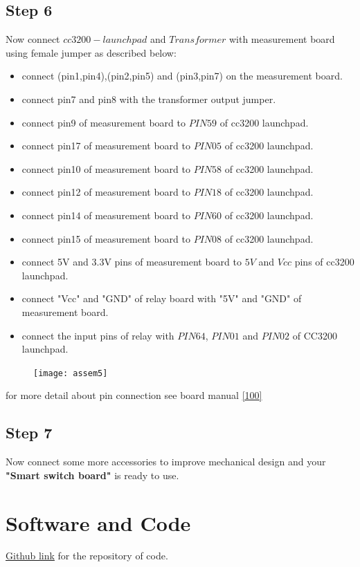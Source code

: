 \documentclass[a4paper,12pt,oneside]{book}
\begin{document}
\subsection*{Step 6}
Now connect $cc3200-launchpad$ and $Transformer$ with measurement board using female jumper as described below:
\begin{itemize}
	\item connect (pin1,pin4),(pin2,pin5) and (pin3,pin7) on the measurement board.
	\item connect pin7 and pin8 with the transformer output jumper.
	\item connect pin9 of measurement board to \textbf{$PIN59$} of cc3200 launchpad.
	\item connect pin17 of measurement board to \textbf{$PIN05$} of cc3200 launchpad.
	\item connect pin10 of measurement board to \textbf{$PIN58$} of cc3200 launchpad.
	\item connect pin12 of measurement board to \textbf{$PIN18$} of cc3200 launchpad.
	\item connect pin14 of measurement board to \textbf{$PIN60$} of cc3200 launchpad.
	\item connect pin15 of measurement board to \textbf{$PIN08$} of cc3200 launchpad.
	\item connect 5V and 3.3V pins of measurement board to $5V$ and $Vcc$ pins of cc3200 launchpad. 
	\item connect "Vcc" and "GND" of relay board with "5V" and "GND" of measurement board.
	\item connect the input pins of relay with $PIN64$, $PIN01$ and $PIN02$
	of CC3200 launchpad.
\end{itemize}
\newpage
\begin{figure}[h]
	\texttt{[image: assem5]}
\end{figure}
for more detail about pin connection see board manual \autoref{100}
\subsection*{Step 7}
Now connect some more accessories to improve mechanical design and your \textbf{"Smart switch board"} is ready to use.

\newpage

\section{Software and Code}
\hspace{7mm}\href{https://github.com/eYSIP-2016/eYSIP2016-GHPowerMonitoring}{Github link} for the repository of code.\\
\end{document}
